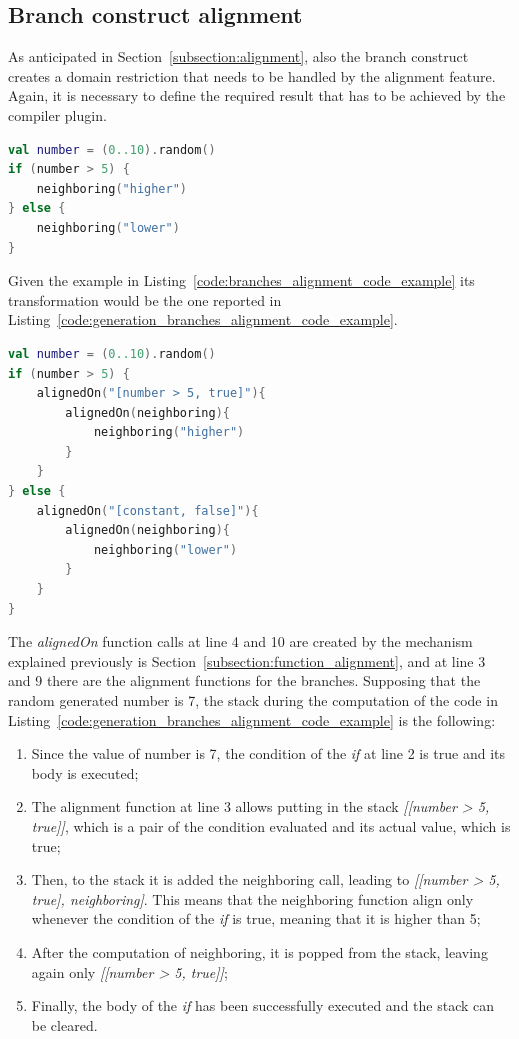 \subsection{Branch construct alignment}\label{subsection:branch_alignment}
As anticipated in Section~\ref{subsection:alignment}, also the branch construct creates a domain restriction that needs to be handled by the alignment feature.\newline
Again, it is necessary to define the required result that has to be achieved by the compiler plugin.
\begin{lstlisting}[caption={Base example of Koltin code that requires the branch alignment}, captionpos=b, language=Kotlin, label={code:branches_alignment_code_example}]
val number = (0..10).random()
if (number > 5) {
    neighboring("higher")
} else {
    neighboring("lower")
}
\end{lstlisting}
Given the example in Listing~\ref{code:branches_alignment_code_example} its transformation would be the one reported in Listing~\ref{code:generation_branches_alignment_code_example}.
\begin{lstlisting}[caption={Generation goal to handle the alignment of branches required in Listing~\ref{code:first_alignment_code_example}}, captionpos=b, language=Kotlin, label={code:generation_branches_alignment_code_example}]
val number = (0..10).random()
if (number > 5) {
    alignedOn("[number > 5, true]"){
        alignedOn(neighboring){
            neighboring("higher")
        }
    }
} else {
    alignedOn("[constant, false]"){
        alignedOn(neighboring){
            neighboring("lower")
        }
    }
}
\end{lstlisting}
The \textit{alignedOn} function calls at line 4 and 10 are created by the mechanism explained previously is Section~\ref{subsection:function_alignment}, and at line 3 and 9 there are the alignment functions for the branches.\newline
Supposing that the random generated number is 7, the stack during the computation of the code in Listing~\ref{code:generation_branches_alignment_code_example} is the following:
\begin{enumerate}
    \item Since the value of number is 7, the condition of the \textit{if} at line 2 is true and its body is executed;
    \item The alignment function at line 3 allows putting in the stack \textit{[[number > 5, true]]}, which is a pair of the condition evaluated and its actual value, which is true;
    \item Then, to the stack it is added the neighboring call, leading to \textit{[[number > 5, true], neighboring]}. This means that the neighboring function align only whenever the condition of the \textit{if} is true, meaning that it is higher than 5;
    \item After the computation of neighboring, it is popped from the stack, leaving again only \textit{[[number > 5, true]]};
    \item Finally, the body of the \textit{if} has been successfully executed and the stack can be cleared.
\end{enumerate}

